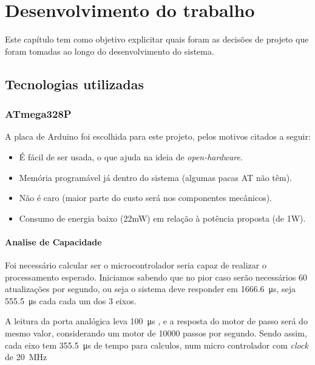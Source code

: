 \chapter{Desenvolvimento do trabalho}

Este capítulo tem como objetivo explicitar quais foram as decisões de projeto que foram tomadas ao longo do desenvolvimento do sistema.

\section{Tecnologias utilizadas}


\subsection{ATmega328P}

A placa de Arduino foi escolhida para este projeto, pelos motivos citados a seguir:

\begin{itemize}
    \item É fácil de ser usada, o que ajuda na ideia de \textit{open-hardware}.
    
    \item Memória programável já dentro do sistema (algumas pacas AT não têm).
    
    \item Não é caro (maior parte do custo será nos componentes mecânicos).
    
    \item Consumo de energia baixo (22mW) em relação à potência proposta (de 1W).
\end{itemize}
\subsubsection{Analise de Capacidade}

Foi necessário calcular ser o microcontrolador seria capaz de realizar o processamento esperado. Iniciamos sabendo que no pior caso serão necessários 60 atualizações por segundo, ou seja o sistema deve responder em \SI{1666.6}{\micro\second}, seja \SI{555.5}{\micro\second} cada cada um dos 3 eixos.

A leitura da porta analógica leva \SI{100}{\micro\second} \cite{Datasheet}, e a resposta do motor de passo será do mesmo valor, considerando um motor de 10000 passos por segundo. Sendo assim,  cada eixo tem \SI{355.5}{\micro\second} de tempo para calculos, num micro controlador com \textit{clock} de \SI{20}{\mega\hertz}

